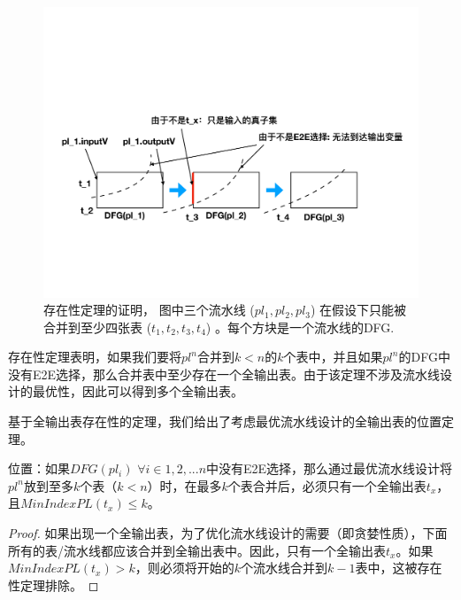 \begin{figure}[!htbp]
\includegraphics[width=0.9\linewidth]{figures/lp-69.pdf}
\centering
\caption{\small 存在性定理的证明， 图中三个流水线 ($pl_1, pl_2, pl_3$) 在假设下只能被合并到至少四张表 ($t_1, t_2, t_3, t_4$) 。每个方块是一个流水线的DFG.}
\label{fig:proof}
\end{figure}

存在性定理表明，如果我们要将$pl^n$合并到$k < n$的$k$个表中，并且如果$pl^n$的DFG中没有E2E选择，那么合并表中至少存在一个全输出表。由于该定理不涉及流水线设计的最优性，因此可以得到多个全输出表。

基于全输出表存在性的定理，我们给出了考虑最优流水线设计的全输出表的位置定理。

\begin{theorem}
位置：如果$DFG(pl_i)$ $\forall i \in 1, 2, ... n$中没有E2E选择，那么通过最优流水线设计将$pl^n$放到至多$k$个表（$k < n$）时，在最多$k$个表合并后，必须只有一个全输出表$t_x$，且$MinIndexPL(t_x) \leq k$。
\end{theorem}

\begin{proof}
如果出现一个全输出表，为了优化流水线设计的需要（即贪婪性质），下面所有的表/流水线都应该合并到全输出表中。因此，只有一个全输出表$t_x$。如果$MinIndexPL(t_x) > k$，则必须将开始的$k$个流水线合并到$k-1$表中，这被存在性定理排除。
\end{proof}


